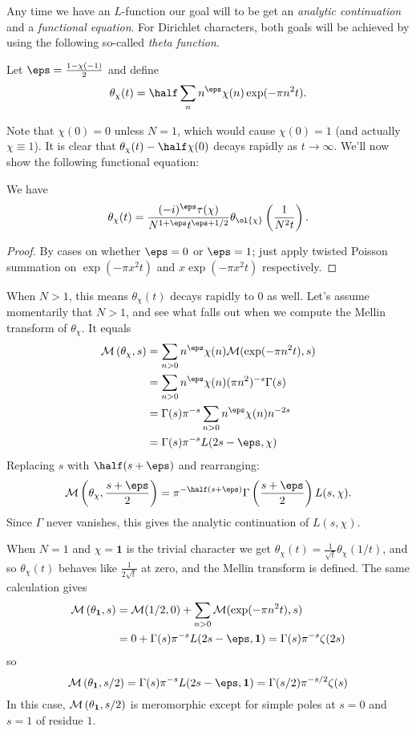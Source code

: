 Any time we have an $L$-function
our goal will to be get an \emph{analytic continuation}
and a \emph{functional equation}.
For Dirichlet characters, both goals will be achieved
by using the following so-called \emph{theta function}.
\begin{definition}
  Let $\eps = \frac{1-\chi(-1)}{2}$ and define
  \[ \theta_\chi(t)
  = \half \sum_n n^\eps \chi(n) \exp(-\pi n^2 t). \]
\end{definition}
Note that $\chi(0) = 0$ unless $N = 1$,
which would cause $\chi(0) = 1$
(and actually $\chi \equiv 1$).
It is clear that $\theta_\chi(t) - \half \chi(0)$
decays rapidly as $t \to \infty$.
We'll now show the following functional equation:
\begin{proposition}
  We have
  \[ \theta_\chi(t) = \frac{(-i)^\eps \tau(\chi)}
    {N^{1+\eps} t^{\eps+1/2}}
    \theta_{\ol{\chi}} \left( \frac{1}{N^2 t} \right). \]
\end{proposition}
\begin{proof}
  By cases on whether $\eps = 0$ or $\eps = 1$;
  just apply twisted Poisson summation
  on $\exp(-\pi x^2t)$ and $x\exp(-\pi x^2t)$ respectively.
\end{proof}
When $N > 1$, this means $\theta_\chi(t)$
decays rapidly to $0$ as well.
Let's assume momentarily that $N > 1$,
and see what falls out when we compute the
Mellin transform of $\theta_\chi$.
It equals
\begin{align*}
  \MM\left(\theta_\chi, s\right)
  &= \sum_{n>0} n^\eps \chi(n)
    \MM(\exp(-\pi n^2t), s) \\
  &= \sum_{n>0} n^\eps \chi(n) (\pi n^2)^{-s} \Gamma(s) \\
  &= \Gamma(s) \pi^{-s} \sum_{n>0} n^\eps \chi(n) n^{-2s} \\
  &= \Gamma(s) \pi^{-s} L(2s-\eps, \chi)
\end{align*}
Replacing $s$ with $\half(s+\eps)$ and rearranging:
\[ \MM\left(\theta_\chi, \frac{s+\eps}{2} \right)
  = \pi^{-\half(s+\eps)}
  \Gamma\left( \frac{s+\eps}{2} \right) L(s, \chi).  \]
Since $\Gamma$ never vanishes,
this gives the analytic continuation of $L(s, \chi)$.

When $N = 1$ and $\chi = \mathbf 1$ is the trivial character we get
$\theta_\chi(t) = \frac{1}{\sqrt t} \theta_{\chi}(1/t)$,
and so $\theta_\chi(t)$ behaves like $\frac{1}{2\sqrt t}$ at zero,
and the Mellin transform is defined.
The same calculation gives
\begin{align*}
  \MM\left(\theta_{\mathbf 1}, s\right)
  &= \MM(1/2, 0) + \sum_{n>0} \MM(\exp(-\pi n^2t), s) \\
  &= 0 + \Gamma(s) \pi^{-s} L(2s-\eps, \mathbf 1)
  = \Gamma(s) \pi^{-s} \zeta(2s)
\end{align*}
so
\[ \MM\left(\theta_{\mathbf 1}, s/2 \right)
  = \Gamma(s) \pi^{-s} L(2s-\eps, \mathbf 1)
  = \Gamma(s/2) \pi^{-s/2} \zeta(s) \]
In this case, $\mathcal M\left(\theta_{\mathbf 1}, s/2 \right)$
is meromorphic except for simple poles at $s=0$ and $s=1$
of residue $1$.

